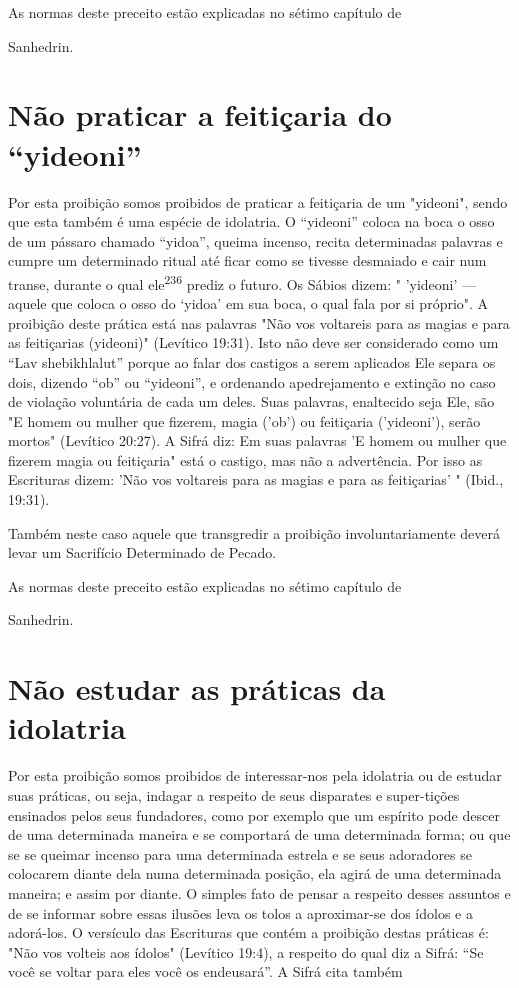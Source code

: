As normas deste preceito estão explicadas no sétimo capítulo de


Sanhedrin.


\section{Não praticar a feitiçaria do ``yideoni''}


Por esta proibição somos proibidos de praticar a feitiçaria de um
"yi­deoni", sendo que esta também é uma espécie de idolatria. O
``yideoni'' colo­ca na boca o osso de um pássaro chamado ``yidoa'', queima
incenso, recita de­terminadas palavras e cumpre um determinado ritual
até ficar como se tivesse desmaiado e cair num transe, durante o qual
ele\textsuperscript{236} prediz o futuro. Os Sábios dizem: " 'yideoni'
--- aquele que coloca o osso do `yidoa' em sua boca, o qual fala por si
próprio". A proibição deste prática está nas palavras "Não vos
volta­reis para as magias e para as feitiçarias (yideoni)" (Levítico
19:31). Isto não deve ser considerado como um ``Lav shebikhlalut'' porque
ao falar dos castigos a serem aplicados Ele separa os dois, dizendo ``ob''
ou ``yideoni'', e ordenando apedrejamento e extinção no caso de violação
voluntária de cada um deles. Suas palavras, enaltecido seja Ele, são "E
homem ou mulher que fizerem, magia ('ob') ou feitiçaria ('yideoni'),
serão mortos" (Levítico 20:27). A Sifrá diz: Em suas pa­lavras 'E homem
ou mulher que fizerem magia ou feitiçaria" está o castigo, mas não a
advertência. Por isso as Escrituras dizem: 'Não vos voltareis para as
ma­gias e para as feitiçarias' " (Ibid., 19:31).

Também neste caso aquele que transgredir a proibição involuntaria­mente
deverá levar um Sacrifício Determinado de Pecado.


As normas deste preceito estão explicadas no sétimo capítulo de


Sanhedrin.

\section{Não estudar as práticas da idolatria}

Por esta proibição somos proibidos de interessar-nos pela idolatria ou
de estudar suas práticas, ou seja, indagar a respeito de seus disparates
e super-tições ensinados pelos seus fundadores, como por exemplo que um
espírito po­de descer de uma determinada maneira e se comportará de uma
determinada forma; ou que se se queimar incenso para uma determinada
estrela e se seus ado­radores se colocarem diante dela numa determinada
posição, ela agirá de uma determinada maneira; e assim por diante. O
simples fato de pensar a respeito desses assuntos e de se informar sobre
essas ilusões leva os tolos a aproximar-se dos ídolos e a adorá-los. O
versículo das Escrituras que contém a proibição des­tas práticas é: "Não
vos volteis aos ídolos" (Levítico 19:4), a respeito do qual diz a Sifrá:
``Se você se voltar para eles você os endeusará''. A Sifrá cita também

